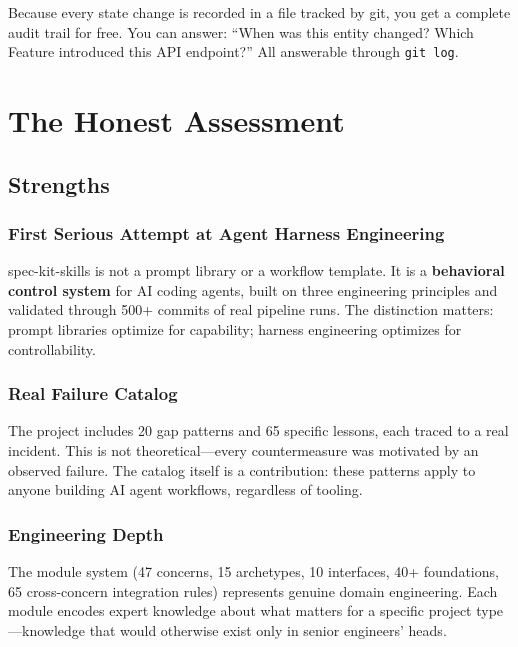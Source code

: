 \documentclass[11pt,a4paper,openright,twoside]{report}
\begin{document}
\begin{notebox}
Because every state change is recorded in a file tracked by git, you get a complete audit trail for free. You can answer: ``When was this entity changed? Which Feature introduced this API endpoint?'' All answerable through \texttt{git log}.
\end{notebox}


\chapter{The Honest Assessment}
\label{ch:assessment}

\section{Strengths}

\subsection{First Serious Attempt at Agent Harness Engineering}

spec-kit-skills is not a prompt library or a workflow template. It is a \textbf{behavioral control system} for AI coding agents, built on three engineering principles and validated through 500+ commits of real pipeline runs. The distinction matters: prompt libraries optimize for capability; harness engineering optimizes for controllability.

\subsection{Real Failure Catalog}

The project includes 20 gap patterns and 65 specific lessons, each traced to a real incident. This is not theoretical---every countermeasure was motivated by an observed failure. The catalog itself is a contribution: these patterns apply to anyone building AI agent workflows, regardless of tooling.

\subsection{Engineering Depth}

The module system (47 concerns, 15 archetypes, 10 interfaces, 40+ foundations, 65 cross-concern integration rules) represents genuine domain engineering. Each module encodes expert knowledge about what matters for a specific project type---knowledge that would otherwise exist only in senior engineers' heads.
\end{document}
